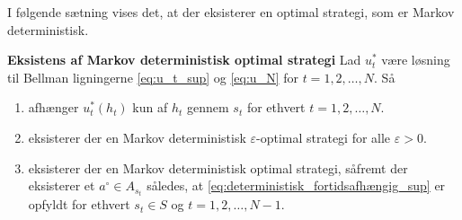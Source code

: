 I følgende sætning vises det, at der eksisterer en optimal strategi, som er Markov deterministisk.

\begin{thmx}\label{sæt:deterministisk_Markov_optimal_strategi} \textbf{Eksistens af Markov deterministisk optimal strategi} %
\newline
Lad $u_t^*$ være løsning til Bellman ligningerne \eqref{eq:u_t_sup} og \eqref{eq:u_N} for $t=1, 2, \ldots, N$. Så
\begin{enumerate}
    \item afhænger $u_t^*(h_t)$ kun af $h_t$ gennem $s_t$ for ethvert $t=1, 2, \ldots, N$.
    \item eksisterer der en Markov deterministisk $\varepsilon$-optimal strategi for alle $\varepsilon>0$.
    \item eksisterer der en Markov deterministisk optimal strategi, såfremt der eksisterer et $a^\circ\in A_{s_t}$ således, at \eqref{eq:deterministisk_fortidsafhængig_sup} er opfyldt for ethvert $s_t\in S$ og $t=1, 2,\ldots, N-1$.
\end{enumerate}
\end{thmx}

